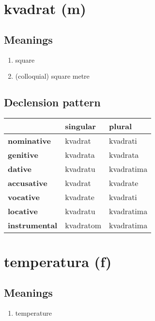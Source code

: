 \filbreak
\section{kvadrat (m)}
\subsection*{Meanings}
\begin{enumerate}
\item square
\item (colloquial) square metre
\end{enumerate}
\subsection*{Declension pattern}
\begin{tabularx}{\linewidth}{Xll}
\toprule
{} &   singular &      plural \\
\midrule
\textbf{nominative  } &    kvadrat &    kvadrati \\
\textbf{genitive    } &   kvadrata &    kvadrata \\
\textbf{dative      } &   kvadratu &  kvadratima \\
\textbf{accusative  } &    kvadrat &    kvadrate \\
\textbf{vocative    } &   kvadrate &    kvadrati \\
\textbf{locative    } &   kvadratu &  kvadratima \\
\textbf{instrumental} &  kvadratom &  kvadratima \\
\bottomrule
\end{tabularx}

\filbreak
\section{temperatura (f)}
\subsection*{Meanings}
\begin{enumerate}
\item temperature
\end{enumerate}
